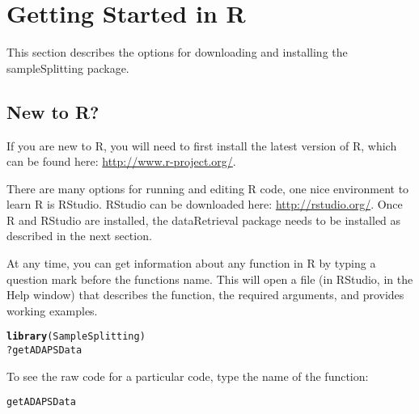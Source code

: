 \documentclass[a4paper,11pt]{article}\usepackage[]{graphicx}\usepackage[]{color}
\makeatletter
\newcommand{\hlopt}[1]{\textcolor[rgb]{0,0,0}{#1}}%
\newcommand{\hlstd}[1]{\textcolor[rgb]{0.345,0.345,0.345}{#1}}%
\newcommand{\hlkwd}[1]{\textcolor[rgb]{0.737,0.353,0.396}{\textbf{#1}}}%
\newenvironment{kframe}{%
 \def\at@end@of@kframe{}%
 \ifinner\ifhmode%
  \def\at@end@of@kframe{\end{minipage}}%
  \begin{minipage}{\columnwidth}%
 \fi\fi%
 \def\FrameCommand##1{\hskip\@totalleftmargin \hskip-\fboxsep
 \colorbox{shadecolor}{##1}\hskip-\fboxsep
     \hskip-\linewidth \hskip-\@totalleftmargin \hskip\columnwidth}%
 \MakeFramed {\advance\hsize-\width
   \@totalleftmargin\z@ \linewidth\hsize
   \@setminipage}}%
 {\par\unskip\endMakeFramed%
 \at@end@of@kframe}
\newenvironment{knitrout}{}{} %
\makeatother
\begin{document}
\section{Getting Started in R}
This section describes the options for downloading and installing the sampleSplitting package.

\subsection{New to R?}
If you are new to R, you will need to first install the latest version of R, which can be found here: \url{http://www.r-project.org/}.

There are many options for running and editing R code, one nice environment to learn R is RStudio. RStudio can be downloaded here: \url{http://rstudio.org/}. Once R and RStudio are installed, the dataRetrieval package needs to be installed as described in the next section.

At any time, you can get information about any function in R by typing a question mark before the functions name.  This will open a file (in RStudio, in the Help window) that describes the function, the required arguments, and provides working examples.

\begin{knitrout}
\color{fgcolor}\begin{kframe}
\begin{alltt}
\hlkwd{library}\hlstd{(SampleSplitting)}
\hlopt{?}\hlstd{getADAPSData}
\end{alltt}
\end{kframe}
\end{knitrout}


To see the raw code for a particular code, type the name of the function:
\begin{knitrout}
\color{fgcolor}\begin{kframe}
\begin{alltt}
\hlstd{getADAPSData}
\end{alltt}
\end{kframe}
\end{knitrout}


\end{document}
